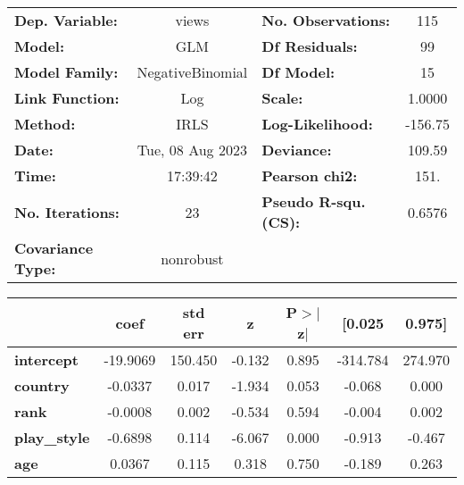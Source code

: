 \begin{center}
\begin{tabular}{lclc}
\toprule
\textbf{Dep. Variable:}           &      views       & \textbf{  No. Observations:  } &      115    \\
\textbf{Model:}                   &       GLM        & \textbf{  Df Residuals:      } &       99    \\
\textbf{Model Family:}            & NegativeBinomial & \textbf{  Df Model:          } &       15    \\
\textbf{Link Function:}           &       Log        & \textbf{  Scale:             } &    1.0000   \\
\textbf{Method:}                  &       IRLS       & \textbf{  Log-Likelihood:    } &   -156.75   \\
\textbf{Date:}                    & Tue, 08 Aug 2023 & \textbf{  Deviance:          } &    109.59   \\
\textbf{Time:}                    &     17:39:42     & \textbf{  Pearson chi2:      } &     151.    \\
\textbf{No. Iterations:}          &        23        & \textbf{  Pseudo R-squ. (CS):} &   0.6576    \\
\textbf{Covariance Type:}         &    nonrobust     & \textbf{                     } &             \\
\bottomrule
\end{tabular}
\begin{tabular}{lcccccc}
                                  & \textbf{coef} & \textbf{std err} & \textbf{z} & \textbf{P$> |$z$|$} & \textbf{[0.025} & \textbf{0.975]}  \\
\midrule
\textbf{intercept}                &     -19.9069  &      150.450     &    -0.132  &         0.895        &     -314.784    &      274.970     \\
\textbf{country}                  &      -0.0337  &        0.017     &    -1.934  &         0.053        &       -0.068    &        0.000     \\
\textbf{rank}                     &      -0.0008  &        0.002     &    -0.534  &         0.594        &       -0.004    &        0.002     \\
\textbf{play\_style}              &      -0.6898  &        0.114     &    -6.067  &         0.000        &       -0.913    &       -0.467     \\
\textbf{age}                      &       0.0367  &        0.115     &     0.318  &         0.750        &       -0.189    &        0.263     \\

\end{tabular}
\end{center}
